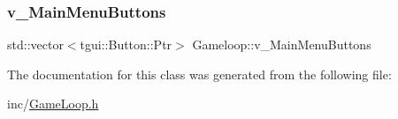 \mbox{\label{class_gameloop_aa9a5171b1ec266ee56d8369062848bbc}} 
\subsubsection{\texorpdfstring{v\+\_\+\+Main\+Menu\+Buttons}{v\_MainMenuButtons}}
{\footnotesize\ttfamily std\+::vector$<$tgui\+::\+Button\+::\+Ptr$>$ Gameloop\+::v\+\_\+\+Main\+Menu\+Buttons}



The documentation for this class was generated from the following file\+:\begin{DoxyCompactItemize}
\item 
inc/\mbox{\hyperlink{_game_loop_8h}{Game\+Loop.\+h}}\end{DoxyCompactItemize}
